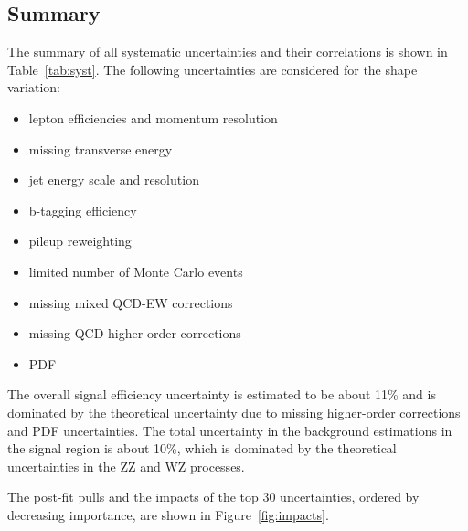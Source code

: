\subsection{Summary}
\label{sec:syst_summary}

The summary of all systematic uncertainties and their correlations is shown in Table~\ref{tab:syst}.
The following uncertainties are considered for the shape variation:
\begin{itemize}
\item lepton efficiencies and momentum resolution 
\item missing transverse energy 
\item jet energy scale and resolution 
\item b-tagging efficiency 
\item pileup reweighting 
\item limited number of Monte Carlo events
\item missing mixed QCD-EW corrections
\item missing QCD higher-order corrections
\item PDF
\end{itemize}

The overall signal efficiency uncertainty is estimated to be about 11\%
and is dominated by the theoretical uncertainty due to missing
higher-order corrections and PDF uncertainties. The total uncertainty in the 
background estimations in the signal region is about 10\%, which is 
dominated by the theoretical uncertainties in the ZZ and WZ processes.

The post-fit pulls and the impacts of the top 30 uncertainties, ordered by decreasing importance,
are shown in Figure~\ref{fig:impacts}.

